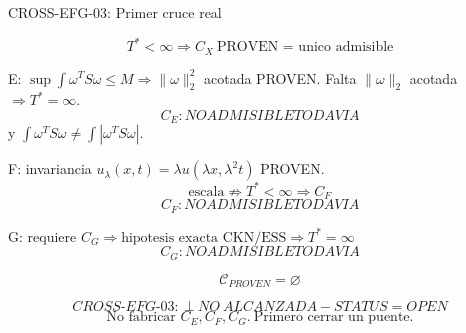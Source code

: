 \documentclass[11pt]{article}
\begin{document}
\begin{center}
{\Large CROSS-EFG-03: Primer cruce real}
\end{center}

\[
\boxed{T^*<\infty\Rightarrow C_X\ \text{PROVEN = unico admisible}}
\]

E: $\sup\int\omega^T S\omega\le M\Rightarrow\|\omega\|_2^2$ acotada PROVEN.
Falta $\|\omega\|_2$ acotada $\Rightarrow T^*=\infty$.
\[
\boxed{C_E: NO ADMISIBLE TODAVIA}
\]
y $\int\omega^T S\omega\neq\int|\omega^T S\omega|$.

F: invariancia $u_\lambda(x,t)=\lambda u(\lambda x,\lambda^2t)$ PROVEN.
\[
\boxed{\text{escala}\not\Rightarrow T^*<\infty\Rightarrow C_F}
\]
\[
\boxed{C_F: NO ADMISIBLE TODAVIA}
\]

G: requiere $\boxed{C_G\Rightarrow\text{hipotesis exacta CKN/ESS}\Rightarrow T^*=\infty}$
\[
\boxed{C_G: NO ADMISIBLE TODAVIA}
\]

\[
\boxed{\mathcal C_{PROVEN}=\varnothing}
\]

\[
\boxed{CROSS\text{-}EFG\text{-}03:\ \bot\ NO\ ALCANZADA - STATUS=OPEN}
\]
\[
\boxed{\text{No fabricar }C_E,C_F,C_G.\ \text{Primero cerrar un puente.}}
\]
\end{document}
